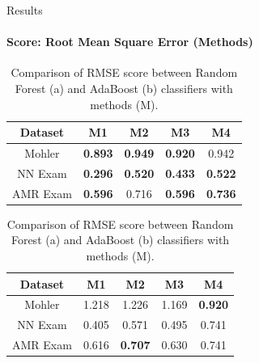 \documentclass[aspectratio=169]{beamer}
\begin{document}
\begin{frame}{Results}
\framesubtitle{Score: Root Mean Square Error (Methods)}
\begin{table}
	\begin{subtable}[c]{0.5\textwidth}
		\centering
		\begin{tabular}{|c|c|c|c|c|}
			\hline
			Dataset & M1 & M2 & M3 & M4 \\
			\hline
			Mohler & \textbf{0.893}  &\textbf{0.949} &\textbf{0.920} &0.942 \\
			\hline
			NN Exam &\textbf{0.296} &\textbf{0.520} &\textbf{0.433} &\textbf{0.522} \\
			\hline
			AMR Exam &\textbf{0.596} &0.716 &\textbf{0.596} & \textbf{0.736} \\
			\hline
		\end{tabular}
		\subcaption{}
	\end{subtable}
	\begin{subtable}[c]{0.5\textwidth}
		\centering
		\begin{tabular}{|c|c|c|c|c|}
			\hline
			Dataset & M1 & M2 & M3 & M4 \\
			\hline
			Mohler &1.218  &1.226 &1.169 &\textbf{0.920} \\
			\hline
			NN Exam &0.405 &0.571 &{0.495} &0.741 \\
			\hline
			AMR Exam &0.616 &\textbf{0.707} &0.630 &{0.741} \\
			\hline
		\end{tabular}	
		\subcaption{}
	\end{subtable}
	\caption{Comparison of RMSE score between Random Forest (a) and AdaBoost (b) classifiers with methods (M).}
\end{table}
\end{frame}
\end{document}
